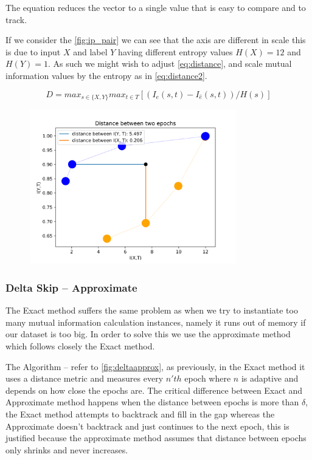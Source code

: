   The equation reduces the vector to a single value that is easy to compare and
  to track.

  If we consider the \autoref{fig:ip_pair} we can see that the axis are
  different in scale this is due to input $X$ and label $Y$ having different
  entropy values $ H(X) = 12 $ and $ H(Y) = 1 $. As such we might wish to adjust
  \autoref{eq:distance}, and scale mutual information values by the entropy as
  in \autoref{eq:distance2}.

  \begin{equation}
    D = max_{s\in\{X, Y\}} max_{t\in T} [(I_e(s, t) - I_{\hat{e}}(s, t)) / H(s)]
    \label{eq:distance2}
  \end{equation} 

  \begin{figure}[H]
    \centering
    \includegraphics[width=0.80\textwidth]{figs/ip_pair.png}
    \label{fig:ip_pair}
  \end{figure}

\subsubsection{Delta Skip -- Approximate}

  The Exact method suffers the same problem as when we try to instantiate too
  many mutual information calculation instances, namely it runs out of memory if
  our dataset is too big. In order to solve this we use the approximate method
  which follows closely the Exact method. 

  The Algorithm -- refer to \autoref{fig:deltaapprox}, as previously, in the
  Exact method it uses a distance metric and measures every $n'th$ epoch where
  $n$ is adaptive and depends on how close the epochs are. The critical
  difference between Exact and Approximate method happens when the distance
  between epochs is more than $\delta$, the Exact method attempts to backtrack
  and fill in the gap whereas the Approximate doesn't backtrack and just
  continues to the next epoch, this is justified because the approximate method
  assumes that distance between epochs only shrinks and never increases.

